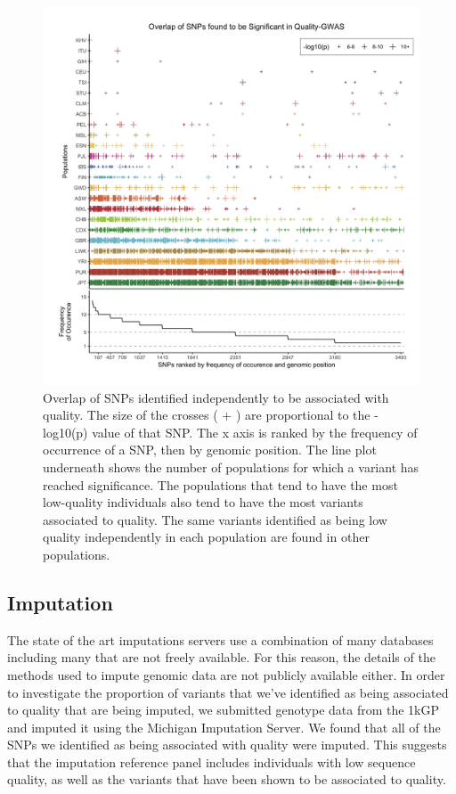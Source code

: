 \documentclass[9pt,lineno]{elife}
\begin{document}
\begin{figure}
\includegraphics[width=\hsize,keepaspectratio]{SNPOverlap6.jpg}

\caption{Overlap of SNPs identified independently to be associated with quality. 
The size of the crosses ( + ) are proportional to the -log10(p) value of that SNP.
The x axis is ranked by the frequency of occurrence of a SNP, then by genomic position.
The line plot underneath shows the number of populations for which a variant has reached significance.
The populations that tend to have the most low-quality individuals also tend to have the most variants associated to quality. 
The same variants identified as being low quality independently in each population are found in other populations. }
  \label{OverLap}
\end{figure}

	\subsection{Imputation}
The state of the art imputations servers use a combination of many databases including many that are not freely available.
For this reason, the details of the methods used to impute genomic data are not publicly available either.
In order to investigate the proportion of variants that we've identified as being associated to quality that are being imputed, we submitted genotype data from the 1kGP and imputed it using the Michigan Imputation Server.
We found that all of the SNPs we identified as being associated with quality were imputed.
This suggests that the imputation reference panel includes individuals with low sequence quality, as well as the variants that have been shown to be associated to quality. 
\end{document}
